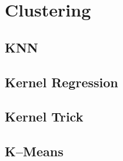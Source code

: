 \documentclass[18pt,a3paper,landscape, ncols=2]{cheatsheet}
\begin{document}
\vfill\null %
\columnbreak %

\section{Clustering} \seperator %
	\subsection{KNN}
		\begin{mdframed}
		\end{mdframed}
	\subsection{Kernel Regression}
		\begin{mdframed}
		\end{mdframed}
	\subsection{Kernel Trick}
		\begin{mdframed}
		\end{mdframed}
	\subsection{K--Means}
		\begin{mdframed}
		\end{mdframed}

\end{document}
